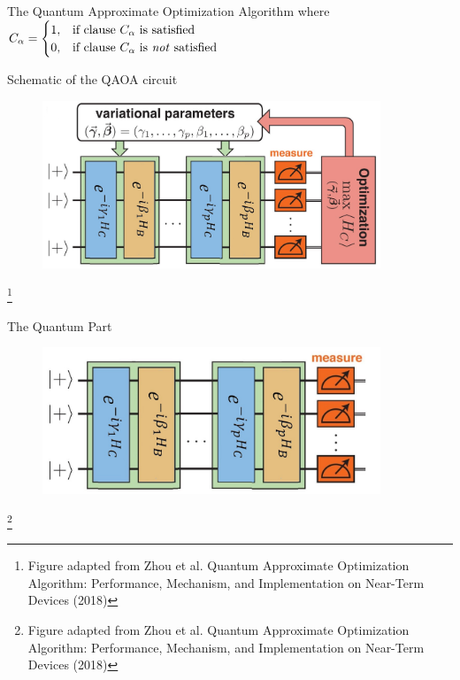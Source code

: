 \documentclass{beamer}
\newcommand\blfootnote[1]{%
	\begingroup
	\renewcommand\thefootnote{}\footnote{#1}%
	\addtocounter{footnote}{-1}%
	\endgroup
}
\begin{document}
{\begin{frame}{The Quantum Approximate Optimization Algorithm}
where $C_{\alpha} =\begin{cases}
1, & \text{if clause $C_{\alpha}$ is satisfied}\\
0, & \text{if clause $C_{\alpha}$ is \emph{not} satisfied}
\end{cases}$
\end{frame}


\begin{frame}{Schematic of the QAOA circuit}
\begin{figure}
	\includegraphics[width=0.9\textwidth]{figures/qaoa_idea_edit_complete}
\end{figure}
\blfootnote{Figure adapted from Zhou et al. Quantum Approximate Optimization Algorithm: Performance, Mechanism, and Implementation on Near-Term Devices (2018)}
\end{frame}

\begin{frame}{The Quantum Part}
\begin{figure}
	\includegraphics[width=0.9\textwidth]{figures/qaoa_idea_edit}
\end{figure}
\blfootnote{Figure adapted from Zhou et al. Quantum Approximate Optimization Algorithm: Performance, Mechanism, and Implementation on Near-Term Devices (2018)}
\end{frame}

}
\end{document}
